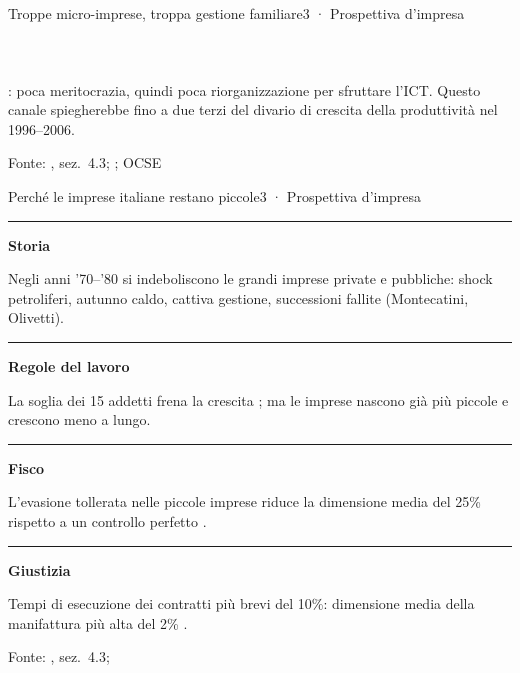\documentclass[aspectratio=169,10pt]{beamer}
\newcommand{\fonte}[1]{\vfill{\tiny\color{muted}#1\par}}
\newcommand{\bignum}[1]{{\color{accent}\fontsize{18}{21}\selectfont\bfseries #1}}
\newcommand{\cardrule}{{\color{ink}\rule{\linewidth}{0.8pt}}\par\vspace{0.4em}}
\newcommand{\statcard}[2]{\cardrule\bignum{#1}\par\vspace{0.3em}{\small\raggedright #2\par}}
\newcommand{\nota}[1]{{\setlength{\fboxsep}{7pt}\colorbox{paper2}{\parbox{\dimexpr\linewidth-14pt}{\small\raggedright #1}}}}
\newcommand{\riga}[2]{{\color{rulegray}\rule{\linewidth}{0.5pt}}\par\vspace{0.1em}%
  \begin{minipage}[t]{0.25\linewidth}\raggedright\small\leavevmode\color{ink}\bfseries #1\end{minipage}\hfill
  \begin{minipage}[t]{0.72\linewidth}\raggedright\small #2\end{minipage}\par\vspace{0.35em}}
\begin{document}
\begin{frame}{Troppe micro-imprese, troppa gestione familiare}{3 · Prospettiva d’impresa}
  \vspace{0.6em}
  \begin{columns}[T]
    \statcard{oltre 40\%}{degli occupati lavora in micro-imprese da 1 a 9 addetti; circa 20\% in Germania e Francia}
    \statcard{circa $-$50\%}{la produttività delle micro-imprese rispetto alle omologhe francesi e tedesche; sopra i 10 addetti il divario si chiude}
    \statcard{oltre 2/3}{delle imprese familiari con più di 10 addetti ha un management interamente familiare: altrove è un’eccezione}
  \end{columns}
  \vfill
  \nota{\citet{pellegrino2017}: poca meritocrazia, quindi poca riorganizzazione per sfruttare l’ICT. Questo canale spiegherebbe fino a due terzi del divario di crescita della produttività nel 1996–2006.}
  \fonte{Fonte: \citet{krahe2023}, sez.~4.3; \citet{bugamelli2018}; OCSE}
\end{frame}

\begin{frame}{Perché le imprese italiane restano piccole}{3 · Prospettiva d’impresa}
  \vspace{0.4em}
  \riga{Storia}{Negli anni ’70–’80 si indeboliscono le grandi imprese private e pubbliche: shock petroliferi, autunno caldo, cattiva gestione, successioni fallite (Montecatini, Olivetti).}
  \riga{Regole del lavoro}{La soglia dei 15 addetti frena la crescita \citep{lenzu2019}; ma le imprese nascono già più piccole e crescono meno a lungo.}
  \riga{Fisco}{L’evasione tollerata nelle piccole imprese riduce la dimensione media del 25\% rispetto a un controllo perfetto \citep{bobbio2016}.}
  \riga{Giustizia}{Tempi di esecuzione dei contratti più brevi del 10\%: dimensione media della manifattura più alta del 2\% \citep{giacomelli2017}.}
  \fonte{Fonte: \citet{krahe2023}, sez.~4.3; \citet{amatori2013}}
\end{frame}
\end{document}
